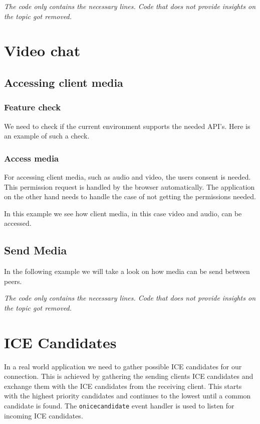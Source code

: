 \textit{The code only contains the necessary lines. Code that does not provide insights on the topic got removed.}


\section{Video chat}

\subsection{Accessing client media}

\subsubsection{Feature check}
We need to check if the current environment supports the needed API's. Here is an example of such a check.


\subsubsection{Access media}
For accessing client media, such as audio and video, the users consent is needed. This permission request is handled by the browser automatically. The application on the other hand needs to handle the case of not getting the permissions needed.

In this example we see how client media, in this case video and audio, can be accessed.


\subsection{Send Media}
In the following example we will take a look on how media can be send between peers.

\textit{The code only contains the necessary lines. Code that does not provide insights on the topic got removed.}


\section{ICE Candidates}
In a real world application we need to gather possible ICE candidates for our connection. This is achieved by gathering the sending clients ICE candidates and exchange them with the ICE candidates from the receiving client. This starts with the highest priority candidates and continues to the lowest until a common candidate is found. The \lstinline[basicstyle=\ttfamily\color{black}]|onicecandidate| event handler is used to listen for incoming ICE candidates.
